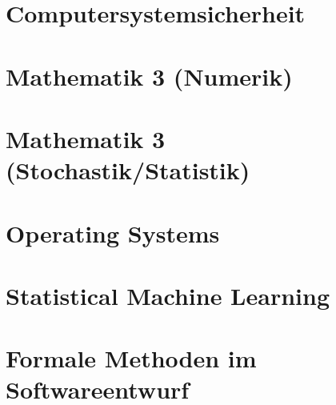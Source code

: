 \documentclass[english, notodo]{fdsummary}
\subtitle{Bachelor of Science (Part 2)}
\newcommand{\lstbasepath}{unset}
\begin{document}
	\maketitle
	\tableofcontents

	\cleardoublepage
	\part{Computersystemsicherheit}
	\graphicspath{{./cs/mandatory/fs3/css-fischlin/}}
	\renewcommand{\lstbasepath}{./cs/mandatory/fs3/css-fischlin}
	

	\cleardoublepage
	\part{Mathematik 3 (Numerik)}
	\graphicspath{{./cs/mandatory/fs4/mathe3-numerik/}}
	\renewcommand{\lstbasepath}{./cs/mandatory/fs4/mathe3-numerik}
	
	\cleardoublepage
	\part{Mathematik 3 (Stochastik/Statistik)}
	\graphicspath{{./cs/mandatory/fs4/mathe3-stochastik/}}
	\renewcommand{\lstbasepath}{./cs/mandatory/fs4/mathe3-stochastik}
	

	\cleardoublepage
	\part{Operating Systems}
	\graphicspath{{./cs/mandatory/fs5/os/}}
	\renewcommand{\lstbasepath}{./cs/mandatory/fs5/os}
	

	\cleardoublepage
	\part{Statistical Machine Learning}
	\graphicspath{{./cs/elective/vc/statml/}}
	\renewcommand{\lstbasepath}{./cs/elective/vc/statml}
	

	\cleardoublepage
	\part{Formale Methoden im Softwareentwurf}
	\graphicspath{{./cs/mandatory/fs4/fmse/}}
	\renewcommand{\lstbasepath}{./cs/mandatory/fs4/fmse}
	
\end{document}
